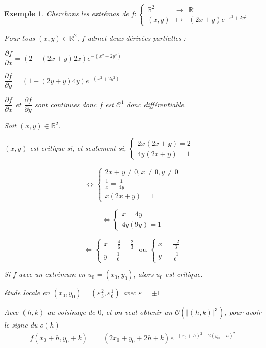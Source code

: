 \documentclass[a4paper,12pt]{book}
\newtheorem{Exe}{Exemple}[section]
\def\R{\mathbb{R}}
\begin{document}
\begin{Exe}
Cherchons les extrémas de $f:\left\{\begin{array}{rcl} \R^2 & \to & \R \\ (x,y) &\mapsto & (2x+y)e^{-x^2+2y^2}\end{array}\right.$
\par Pour tous $(x,y)\in\R^2$, $f$ admet deux dérivées partielles :
\par $\dfrac{\partial f}{\partial x}=(2-(2x+y)2x)e^{-(x^2+2y^2)}$
\par $\dfrac{\partial f}{\partial y}=(1-(2y+y)4y)e^{-(x^2+2y^2)}$
\par $\dfrac{\partial f}{\partial x}$ et $\dfrac{\partial f}{\partial y}$ sont continues donc $f$ est $\mathcal{C}^1$ donc différentiable.
\par Soit $(x,y)\in\R^2$. 
\par $(x,y)$ est critique si, et seulement si, $\begin{cases} 2x(2x+y)=2 \\ 4y(2x+y)=1\end{cases}$
\par $$\Leftrightarrow \begin{cases} 2x+y\neq 0, x\neq 0, y\neq 0 \\ \frac{1}{x}=\frac{1}{4y}\\ x(2x+y)=1\end{cases}$$
\par $$\Leftrightarrow \begin{cases} x = 4y \\ 4y(9y)=1\end{cases}$$
\par $$\Leftrightarrow\begin{cases} x =\frac{4}{6}=\frac{2}{3} \\ y = \frac{1}{6}\end{cases}\text{ ou }\begin{cases}x = \frac{-2}{3} \\ y = \frac{-1}{6}\end{cases}$$
\par Si $f$ avec un extrémum en $u_0 = (x_0, y_0)$, alors $u_0$ est critique.
\par étude locale en $(x_0, y_0)=(\varepsilon\frac{2}{3}, \varepsilon\frac{1}{6})$ avec $\varepsilon=\pm 1$
\par Avec $(h,k)$ au voisinage de $0$, et on veut obtenir un $\mathcal{O}(\Vert(h,k)\Vert^3)$, pour avoir le signe du $o(h)$
\\ \begin{align*} f(x_0+h, y_0+k) &= (2x_0 + y_0 + 2h+k)e^{-(x_0+h)^2 - 2 (y_0+h)^2}\\

\end{align*}
\end{Exe}
\end{document}
